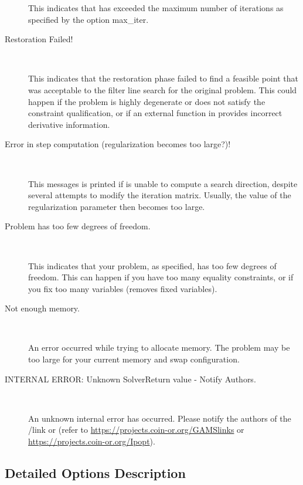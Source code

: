 \begin{description}
    This indicates that \IPOPT has exceeded the maximum number of iterations as specified by the option max\_iter.

\item[Restoration Failed!] ~

    This indicates that the restoration phase failed to find a feasible point that was acceptable to the filter line search for the original problem.
    This could happen if the problem is highly degenerate or does not satisfy the constraint qualification, or if an external function in \GAMS provides incorrect derivative information.

\item[Error in step computation (regularization becomes too large?)!] ~

    This messages is printed if \IPOPT is unable to compute a search direction, despite several attempts to modify the iteration matrix.
    Usually, the value of the regularization parameter then becomes too large.

\item[Problem has too few degrees of freedom.] ~

    This indicates that your problem, as specified, has too few degrees of freedom.
    This can happen if you have too many equality constraints, or if you fix too many variables (\IPOPT removes fixed variables).

\item[Not enough memory.] ~

    An error occurred while trying to allocate memory.
    The problem may be too large for your current memory and swap configuration.

\item[INTERNAL ERROR: Unknown SolverReturn value - Notify \IPOPT Authors.] ~

    An unknown internal error has occurred. Please notify the authors of the \GAMS/\IPOPT link or \IPOPT (refer to \url{https://projects.coin-or.org/GAMSlinks} or \url{https://projects.coin-or.org/Ipopt}).
\end{description}


\subsection{Detailed Options Description}
\label{sub:ipoptoptions}


